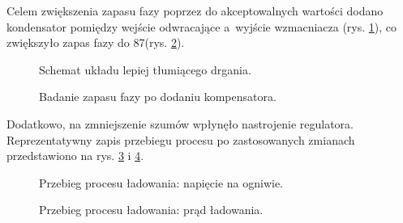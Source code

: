 \documentclass[polish,engineer]{polsl-msth}
\begin{document}
Celem zwiększenia zapasu fazy poprzez do akceptowalnych wartości dodano kondensator pomiędzy wejście odwracające a~wyjście wzmacniacza (rys. \ref{img:HereYouAreMrCap}), co zwiększyło zapas fazy do 87\degree (rys. \ref{img:MrBodeWithCap}).
\begin{figure}[hbtp]
    \centering
     \caption{Schemat układu lepiej tłumiącego drgania. \label{img:HereYouAreMrCap}}
\end{figure}
\begin{figure}[hbtp]
     \caption{Badanie zapasu fazy po dodaniu kompensatora. \label{img:MrBodeWithCap}}
\end{figure}

Dodatkowo, na zmniejszenie szumów wpłynęło nastrojenie regulatora.
Reprezentatywny zapis przebiegu procesu po zastosowanych zmianach przedstawiono na rys. \ref{img:PrettyCharging} i \ref{img:PrettyCharging_I}.
\begin{figure}[hbtp]
     
     \caption{Przebieg procesu ładowania: napięcie na ogniwie. \label{img:PrettyCharging}}
\end{figure}
\begin{figure}[hbtp]
     
     \caption{Przebieg procesu ładowania: prąd ładowania. \label{img:PrettyCharging_I}}
\end{figure}
\end{document}

